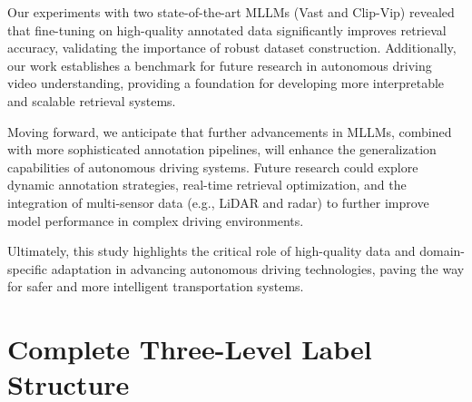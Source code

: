\documentclass[lettersize,journal]{IEEEtran}
\begin{document}
Our experiments with two state-of-the-art MLLMs (Vast and Clip-Vip) revealed that fine-tuning on high-quality annotated data significantly improves retrieval accuracy, validating the importance of robust dataset construction. Additionally, our work establishes a benchmark for future research in autonomous driving video understanding, providing a foundation for developing more interpretable and scalable retrieval systems.

Moving forward, we anticipate that further advancements in MLLMs, combined with more sophisticated annotation pipelines, will enhance the generalization capabilities of autonomous driving systems. Future research could explore dynamic annotation strategies, real-time retrieval optimization, and the integration of multi-sensor data (e.g., LiDAR and radar) to further improve model performance in complex driving environments.

Ultimately, this study highlights the critical role of high-quality data and domain-specific adaptation in advancing autonomous driving technologies, paving the way for safer and more intelligent transportation systems.



\appendices
\section{Complete Three-Level Label Structure}
\label{appendix:three_level_labels}
\end{document}
